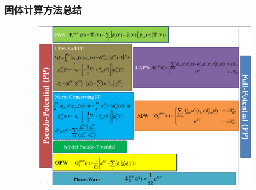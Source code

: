 \documentclass[cjk,slidestop,compress,mathserif,blue]{beamer}
\begin{document}
\frame
{
	\frametitle{固体计算方法总结}
\begin{figure}[h!]
\centering
\vspace*{-0.25in}
\includegraphics[height=2.80in,width=4.10in,viewport=0 0 1190 876,clip]{Figures/Pseudo-Full_Potential.png}
\label{Pseudo-Full_Poential}
\end{figure}
}

\end{document}

